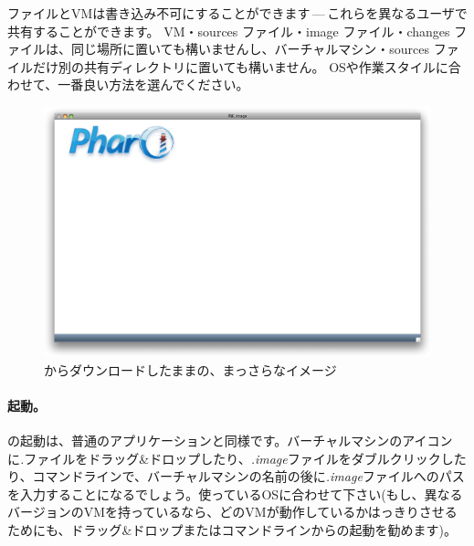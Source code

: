 \documentclass[a4paper,10pt,twoside]{book}
\begin{document}
ファイルとVMは書き込み不可にすることができます\,---\,これらを異なるユーザで共有することができます。
VM・sources ファイル・image ファイル・changes ファイルは、同じ場所に置いても構いませんし、バーチャルマシン・sources ファイルだけ別の共有ディレクトリに置いても構いません。
OSや作業スタイルに合わせて、一番良い方法を選んでください。


\begin{figure}[htb]
\centerline {\includegraphics[width=\textwidth]{startup}}
\caption{\pbe からダウンロードしたままの、まっさらなイメージ}
\end{figure}

\paragraph{起動。} \pharo の起動は、普通のアプリケーションと同様です。バーチャルマシンのアイコンに\emph{.}ファイルをドラッグ\&ドロップしたり、\emph{.image}ファイルをダブルクリックしたり、コマンドラインで、バーチャルマシンの名前の後に\emph{.image}ファイルへのパスを入力することになるでしょう。使っているOSに合わせて下さい(もし、異なるバージョンのVMを持っているなら、どのVMが動作しているかはっきりさせるためにも、ドラッグ\&ドロップまたはコマンドラインからの起動を勧めます)。
\end{document}
